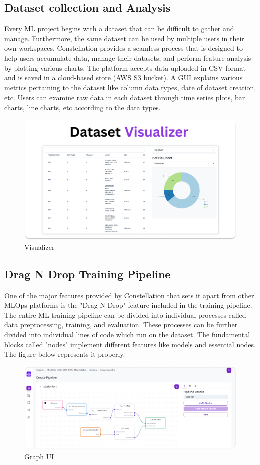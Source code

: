 \documentclass[12pt,a4paper]{report}     %
\begin{document}
\begin{normalsize}
{{{\subsection{Dataset collection and Analysis}
Every ML project begins with a dataset that can be difficult to gather and manage. Furthermore, the same dataset can be used by multiple users in their own workspaces. Constellation provides a seamless process that is designed to help users accumulate data, manage their datasets, and perform feature analysis by plotting various charts. The platform accepts data uploaded in CSV format and is saved in a cloud-based store (AWS
S3 bucket). A GUI explains various metrics pertaining to the dataset like column data types, date of dataset creation, etc. Users can examine raw data in each dataset through time series plots, bar charts, line charts, etc according to the data types.
\begin{figure}[H]
    \centering
    \includegraphics[scale=0.4]{diagrams/Visualizer.png}
    \caption{Visualizer}
    \label{}
\end{figure}
\subsection{Drag N Drop Training Pipeline}
One of the major features provided by Constellation that sets it apart from other MLOps platforms is the "Drag N Drop" feature included in the training pipeline. The entire ML training pipeline can be divided into individual processes called data preprocessing, training, and evaluation. These processes can be further divided into individual lines of code which run on the dataset. The fundamental blocks called "nodes" implement different features like models and essential nodes. The figure below represents it properly.
\begin{figure}[H]
    \centering
    \includegraphics[scale=0.4]{diagrams/Builder.png}
    \caption{Graph UI}
    \label{}
\end{figure}
}}}
\end{normalsize}
\end{document}
